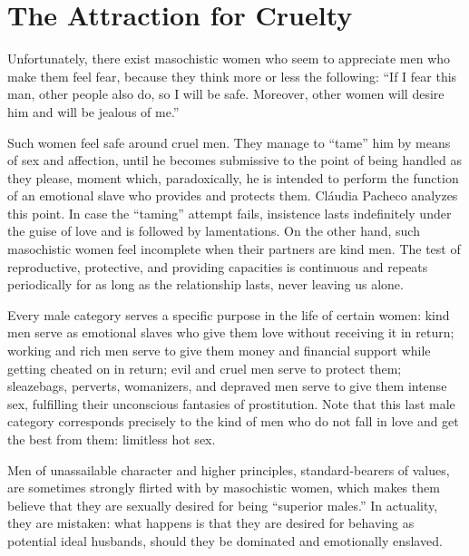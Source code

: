 \section{The Attraction for Cruelty}

\par Unfortunately, there exist masochistic women who seem to appreciate men who make them feel fear, because they think more or less the following: \enquote{If I fear this man, other people also do, so I will be safe. Moreover, other women will desire him and will be jealous of me.}

\par Such women feel safe around cruel men. They manage to \enquote{tame} him by means of sex and affection, until he becomes submissive to the point of being handled as they please, moment which, paradoxically, he is intended to perform the function of an emotional slave who provides and protects them. Cláudia Pacheco analyzes this point. In case the \enquote{taming} attempt fails, insistence lasts indefinitely under the guise of love and is followed by lamentations. On the other hand, such masochistic women feel incomplete when their partners are kind men. The test of reproductive, protective, and providing capacities is continuous and repeats periodically for as long as the relationship lasts, never leaving us alone.

\par Every male category serves a specific purpose in the life of certain women: kind men serve as emotional slaves who give them love without receiving it in return; working and rich men serve to give them money and financial support while getting cheated on in return; evil and cruel men serve to protect them; sleazebags, perverts, womanizers, and depraved men serve to give them intense sex, fulfilling their unconscious fantasies of prostitution\footnotemark[11]. Note that this last male category corresponds precisely to the kind of men who do not fall in love and get the best from them: limitless hot sex.


\par Men of unassailable character and higher principles, standard-bearers of values, are sometimes strongly flirted with by masochistic women, which makes them believe that they are sexually desired for being \enquote{superior males.} In actuality, they are mistaken: what happens is that they are desired for behaving as potential ideal husbands, should they be dominated and emotionally enslaved.


